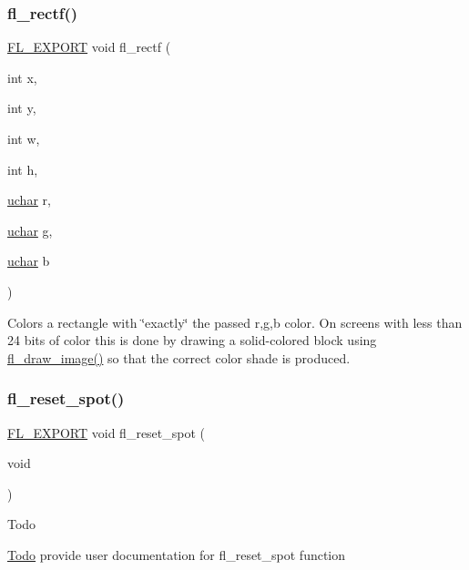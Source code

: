 \subsubsection{\texorpdfstring{fl\+\_\+rectf()}{fl\_rectf()}\hspace{0.1cm}{\footnotesize\ttfamily [3/3]}}
{\footnotesize\ttfamily \hyperlink{_fl___export_8_h_aa9ba29a18aee9d738370a06eeb4470fc}{F\+L\+\_\+\+E\+X\+P\+O\+RT} void fl\+\_\+rectf (\begin{DoxyParamCaption}\item[{int}]{x,  }\item[{int}]{y,  }\item[{int}]{w,  }\item[{int}]{h,  }\item[{\hyperlink{fl__types_8h_a65f85814a8290f9797005d3b28e7e5fc}{uchar}}]{r,  }\item[{\hyperlink{fl__types_8h_a65f85814a8290f9797005d3b28e7e5fc}{uchar}}]{g,  }\item[{\hyperlink{fl__types_8h_a65f85814a8290f9797005d3b28e7e5fc}{uchar}}]{b }\end{DoxyParamCaption})}

Colors a rectangle with \char`\"{}exactly\char`\"{} the passed {\ttfamily r,g,b} color. On screens with less than 24 bits of color this is done by drawing a solid-\/colored block using \hyperlink{group__fl__drawings_gaf9ad52880174bae01461adfa5b4020ff}{fl\+\_\+draw\+\_\+image()} so that the correct color shade is produced. \mbox{\label{group__fl__drawings_gaa6c8068dbc30f05765330e31f08350d7}} 
\subsubsection{\texorpdfstring{fl\+\_\+reset\+\_\+spot()}{fl\_reset\_spot()}}
{\footnotesize\ttfamily \hyperlink{_fl___export_8_h_aa9ba29a18aee9d738370a06eeb4470fc}{F\+L\+\_\+\+E\+X\+P\+O\+RT} void fl\+\_\+reset\+\_\+spot (\begin{DoxyParamCaption}\item[{void}]{ }\end{DoxyParamCaption})}

\begin{DoxyRefDesc}{Todo}
\item[\hyperlink{todo__todo000015}{Todo}]provide user documentation for fl\+\_\+reset\+\_\+spot function \end{DoxyRefDesc}
\mbox{\label{group__fl__drawings_gaf98789ec460134ffc81f2af2d2db6857}} 
